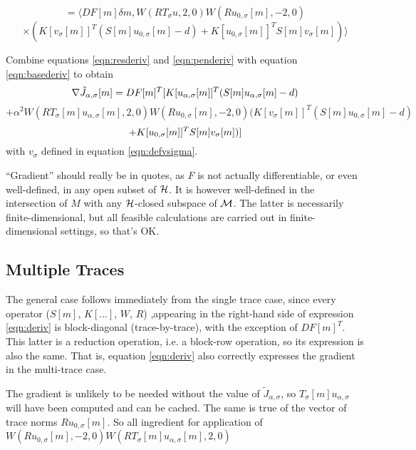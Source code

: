 \[
  = \langle DF[m]\delta m, W(RT_{\sigma}u,2,0)W(Ru_{0,\sigma}[m],-2,0)
\]
\begin{equation}
  \label{eqn:penderiv}
  \times ( K[v_{\sigma}[m]]^T(S[m]u_{0,\sigma}[m]-d)
+
K[u_{0,\sigma}[m]]^T S[m]v_{\sigma}[m])\rangle 
\end{equation}

Combine equations \ref{eqn:resderiv} and \ref{eqn:penderiv} with
equation \ref{eqn:basederiv} to obtain
\[
  \nabla \tilde{J}_{\alpha,\sigma}[m] =
  DF[m]^T\large[ K[u_{\alpha,\sigma}[m]]^T (S[m]u_{\alpha,\sigma}[m]-d)
\]
\[
  + \alpha^2 W(RT_{\sigma}[m]u_{\alpha,\sigma}[m],2,0)W(Ru_{0,\sigma}[m],-2,0) (
  K[v_{\sigma}[m]]^T(S[m]u_{0,\sigma}[m]-d)
\]
\begin{equation}
  \label{eqn:deriv}
+ K[u_{0,\sigma}[m]]^T S[m]v_{\sigma}[m]) \large]
\end{equation}
with $v_{\sigma}$ defined in equation \ref{eqn:defvsigma}.

 ``Gradient'' should really be in quotes, as $F$ is not actually differentiable, or even well-defined, in any open subset of ${\cal H}$. It is however well-defined in the intersection of $M$ with any ${\cal H}$-closed subspace of ${\cal M}$. The latter is necessarily finite-dimensional, but all feasible calculations are carried out in finite-dimensional settings, so that's OK.

\subsection{Multiple Traces}
The general case follows immediately from the single trace case, since
every operator ($S[m]$, $K[...]$, $W$, $R$) ,appearing in the right-hand side of expression
\ref{eqn:deriv} is block-diagonal (trace-by-trace), with the exception
of $DF[m]^T$. This latter is a reduction operation, i.e. a block-row
operation, so its expression is also the same. That is, equation
\ref{eqn:deriv} also correctly expresses the gradient in the
multi-trace case.

The gradient is unlikely to be needed without the value
of $\tilde{J}_{\alpha,\sigma}$, so 
$T_{\sigma}[m]u_{\alpha,\sigma}$ will have been computed and can be
cached. The same is true of the vector of trace norms
$Ru_{0,\sigma}[m]$. So all ingredient for application of
$W(Ru_{0,\sigma}[m],-2,0)W(RT_{\sigma}[m] u_{\alpha,\sigma}[m],2,0)$

